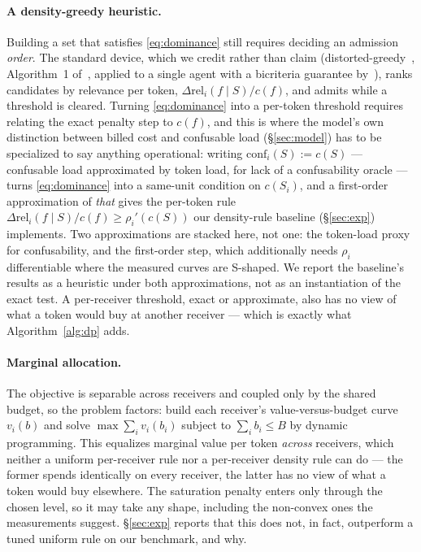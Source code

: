 \documentclass[sigconf,anonymous]{aamas}
\theoremstyle{remark}
\begin{document}
\paragraph{A density-greedy heuristic.} Building a set that satisfies
\eqref{eq:dominance} still requires deciding an admission \emph{order}.
The standard device, which we credit rather than claim
(distorted-greedy~\cite{harshaw2019}, Algorithm~1
of~\cite{shilai2024}, applied to a single agent with a bicriteria
guarantee by~\cite{bps2026}), ranks candidates by relevance per token,
$\Delta\mathrm{rel}_i(f\mid S)/c(f)$, and admits while a threshold is
cleared. Turning \eqref{eq:dominance} into a per-token threshold
requires relating the exact penalty step to $c(f)$, and this is where
the model's own distinction between billed cost and confusable load
(\S\ref{sec:model}) has to be specialized to say anything operational:
writing $\mathrm{conf}_i(S) := c(S)$ --- confusable load approximated
by token load, for lack of a confusability oracle --- turns
\eqref{eq:dominance} into a same-unit condition on $c(S_i)$, and a
first-order approximation of \emph{that} gives the per-token rule
$\Delta\mathrm{rel}_i(f\mid S)/c(f) \ge \rho_i'(c(S))$ our density-rule
baseline (\S\ref{sec:exp}) implements. Two approximations are stacked
here, not one: the token-load proxy for confusability, and the
first-order step, which additionally needs $\rho_i$ differentiable
where the measured curves are S-shaped. We report the baseline's
results as a heuristic under both approximations, not as an
instantiation of the exact test. A per-receiver threshold, exact or
approximate, also has no view of what a token would buy at another
receiver --- which is exactly what
Algorithm~\ref{alg:dp} adds.

\paragraph{Marginal allocation.} The objective is separable across
receivers and coupled only by the shared budget, so the problem
factors: build each receiver's value-versus-budget curve $v_i(b)$ and
solve $\max \sum_i v_i(b_i)$ subject to $\sum_i b_i \le B$ by dynamic
programming. This equalizes marginal value per token \emph{across}
receivers, which neither a uniform per-receiver rule nor a
per-receiver density rule can do --- the former spends identically on
every receiver, the latter has no view of what a token would buy
elsewhere. The saturation penalty enters only through the chosen
level, so it may take any shape, including the non-convex ones the
measurements suggest. \S\ref{sec:exp} reports that this does not, in
fact, outperform a tuned uniform rule on our benchmark, and why.
\end{document}
